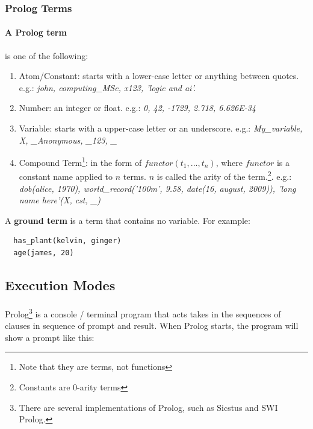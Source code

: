 \documentclass{article}
\begin{document}
\begin{multicols}{2}
  \subsubsection{Prolog Terms}
  
  \paragraph{A Prolog term} is one of the following:
  
  \begin{enumerate}
  \item Atom/Constant: starts with a lower-case letter or anything between quotes. e.g.: \textit{john, computing\_MSc, x123, 'logic and ai'.}
  \item Number: an integer or float. e.g.: \textit{0, 42, -1729, 2.718, 6.626E-34}
  \item Variable: starts with a upper-case letter or an underscore. e.g.: \textit{My\_variable, X, \_Anonymous, \_123, \_} 
  \item Compound Term\footnote{Note that they are terms, not functions}: in the form of $functor(t_1,..., t_n)$, where $functor$ is a constant name applied to $n$ terms. $n$ is called the arity of the term.\footnote{Constants are 0-arity terms}. e.g.: \textit{dob(alice, 1970), world\_record('100m', 9.58, date(16, august, 2009)), 'long name here'(X, cst, \_)}
  \end{enumerate}
  
  \noindent A {\bf ground term} is a term that contains no variable. For example:
  
  \begin{lstlisting}
  has_plant(kelvin, ginger)
  age(james, 20)
  \end{lstlisting}
  
  \subsection{Execution Modes}  
  
  \paragraph{} Prolog\footnote{There are several implementations of Prolog, such as Sicstus and SWI Prolog.} is a console / terminal program that acts takes in the sequences of clauses in sequence of prompt and result. When Prolog starts, the program will show a prompt like this: \vspace{0.3cm}
  

\end{multicols}
\end{document}
